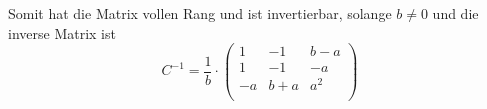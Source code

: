 \documentclass{scrreprt}
\begin{document}
\begin{enumerate}[(a)]
Somit hat die Matrix vollen Rang und ist invertierbar, solange $b \ne 0$ und
die inverse Matrix ist
\[
  C^{-1} = \frac{1}{b} \cdot \begin{pmatrix}
    1  & -1    & b - a \\
    1  & -1    & -a    \\
    -a & b + a & a^2   \\
  \end{pmatrix}
\]
\end{enumerate}
\end{document}
